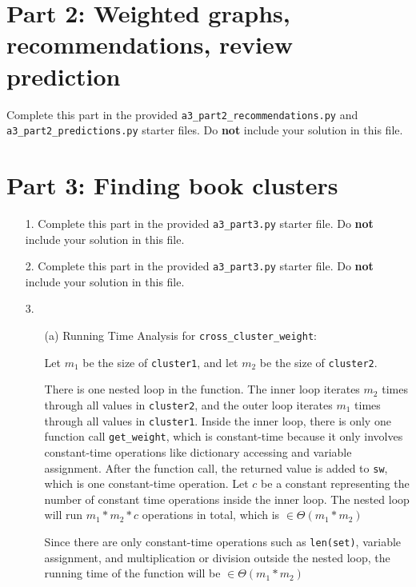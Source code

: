 \documentclass[11pt]{article}
\begin{document}
\section*{Part 2: Weighted graphs, recommendations, review prediction}

Complete this part in the provided \texttt{a3\_part2\_recommendations.py} and \texttt{a3\_part2\_predictions.py} starter files.
Do \textbf{not} include your solution in this file.

\newpage

\section*{Part 3: Finding book clusters}

\begin{enumerate}

\item[1.]
Complete this part in the provided \texttt{a3\_part3.py} starter file.
Do \textbf{not} include your solution in this file.

\item[2.]
Complete this part in the provided \texttt{a3\_part3.py} starter file.
Do \textbf{not} include your solution in this file.

\item[3.]

\begin{enumerate}
\item[(a)]
Running Time Analysis for \texttt{cross\_cluster\_weight}:

Let $m_1$ be the size of \texttt{cluster1}, and let $m_2$ be the size of \texttt{cluster2}.

There is one nested loop in the function. The inner loop iterates $m_2$ times through all values in \texttt{cluster2}, and the outer loop iterates $m_1$ times through all values in \texttt{cluster1}. Inside the inner loop, there is only one function call \texttt{get\_weight}, which is constant-time because it only involves constant-time operations like dictionary accessing and variable assignment. After the function call, the returned value is added to \texttt{sw}, which is one constant-time operation. Let $c$ be a constant representing the number of constant time operations inside the inner loop. The nested loop will run $m_1 * m_2 * c$ operations in total, which is $\in \Theta(m_1 * m_2)$

Since there are only constant-time operations such as \texttt{len(set)}, variable assignment, and multiplication or division outside the nested loop, the running time of the function will be $\in \Theta(m_1 * m_2)$



\end{enumerate}
\end{enumerate}
\end{document}
